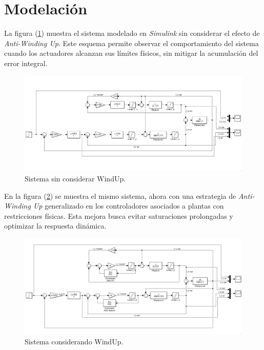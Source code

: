 \section{Modelación}

La figura (\ref{fig:modcsinAWU}) muestra el sistema modelado en \textit{Simulink} sin 
considerar el efecto de \textit{Anti-Winding Up}. Este esquema permite observar el comportamiento del sistema 
cuando los actuadores alcanzan sus límites físicos, sin mitigar la acumulación del error integral.

\begin{figure}[H]
\centering
\includegraphics[trim={0 2.5cm 0 1cm},clip,width=1\linewidth]{img/modelacion/SistsinAWU.png}
\caption{Sistema sin considerar WindUp.}
\label{fig:modcsinAWU}
\end{figure}

En la figura (\ref{fig:modconAWU}) se muestra el mismo sistema, ahora con una estrategia 
de \textit{Anti-Winding Up} generalizado en los controladores asociados a plantas con restricciones físicas. 
Esta mejora busca evitar saturaciones prolongadas y optimizar la respuesta dinámica.

\begin{figure}[H]
\centering
\includegraphics[width=1\linewidth]{img/modelacion/SistconAWU.png}
\caption{Sistema considerando WindUp.}
\label{fig:modconAWU}
\end{figure}
\newpage
